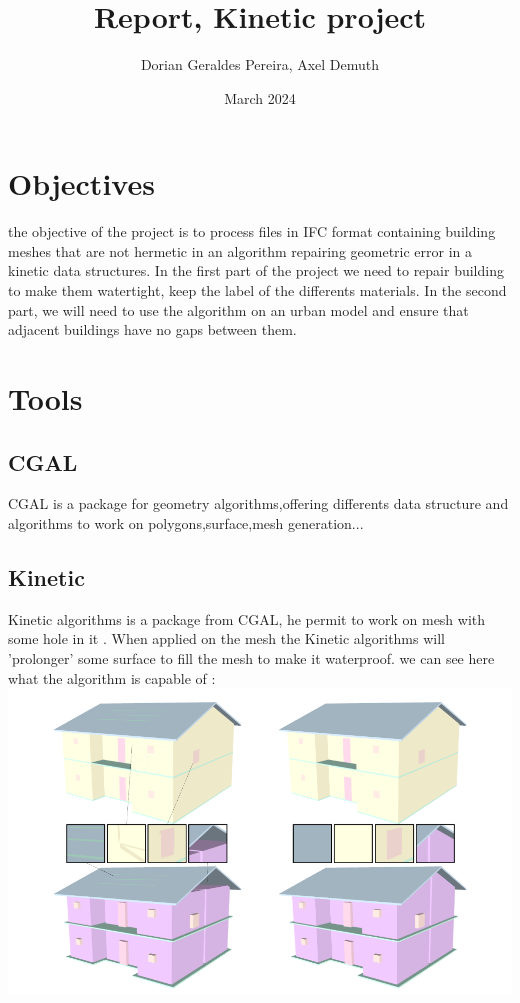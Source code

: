 \documentclass{article}
\title{Report, Kinetic project}
\author{Dorian Geraldes Pereira, Axel Demuth}
\date{March 2024}
\begin{document}
\maketitle
\tableofcontents
\newpage
\section{Objectives}
the objective of the project is to process files in IFC format containing building meshes that are not hermetic in an algorithm repairing
geometric error in a kinetic data structures.
\newline In the first part of the project we need to repair building to make them watertight, keep the label of the differents materials.
In the second part, we will need to use the algorithm on an urban model and ensure that adjacent buildings have no gaps between them. 
\section{Tools}
\subsection{CGAL}
CGAL is a package for geometry algorithms,offering differents data structure and algorithms
to work on polygons,surface,mesh generation... 
\subsection{Kinetic}
Kinetic algorithms is a package from CGAL, he permit to work on mesh with some hole in it .
When applied on the mesh the Kinetic algorithms will 'prolonger' some surface to fill the mesh to make it 
waterproof.
we can see here what the algorithm is capable of :
\includegraphics[scale =   0.3 ]{../../images/example_algorithm.png}
\nocite{*}


\end{document}
